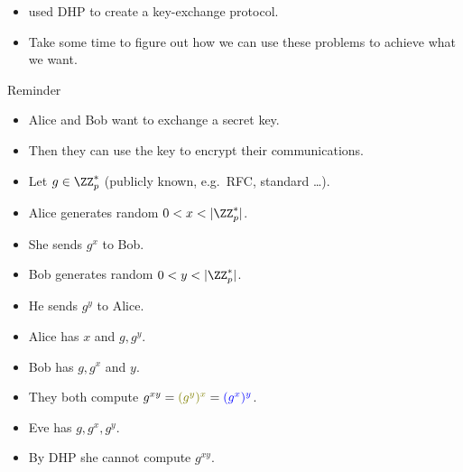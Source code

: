 \begin{frame}
  \begin{exercise}
    \begin{itemize}
      \item \citeauthor{DiffieHellman} used 
        \ac{DHP} to create a key-exchange protocol.

        \pause{}

      \item Take some time to figure out how we can use these problems to 
        achieve what we want.
    \end{itemize}
  \end{exercise}

  \begin{block}{Reminder}
    \begin{itemize}
      \item Alice and Bob want to exchange a secret key.
      \item Then they can use the key to encrypt their communications.
    \end{itemize}
  \end{block}
\end{frame}

\begin{frame}
  \begin{definition}
    \begin{itemize}
      \item Let \(g\in \ZZ_p^*\) (publicly known, e.g.\ RFC, standard \dots).

        \pause{}

      \color{green!50!red}
      \item Alice generates random \(0 < x < |\ZZ_p^*|\).
      \item She sends \(g^x\) to Bob.

        \pause{}

      \color{blue}
      \item Bob generates random \(0 < y < |\ZZ_p^*|\).
      \item He sends \(g^y\) to Alice.

        \pause{}

      \color{green!50!red}
      \item Alice has \(x\) and \(g, g^y\).
      \color{blue}
      \item Bob has \(g, g^x\) and \(y\).
      \color{black}
      \item They both compute \(g^{xy} = {\color{green!50!red} (g^y)^x} 
          = {\color{blue} (g^x)^y}\).

        \pause{}

      \color{red}
      \item Eve has \(g, g^x, g^y\).
      \item By \ac{DHP} she cannot compute \(g^{xy}\).
    \end{itemize}
  \end{definition}
\end{frame}

